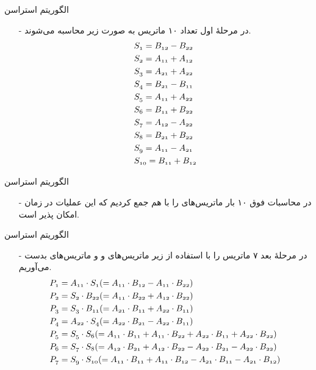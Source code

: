 \begin{frame}{‌الگوریتم استراسن}
\begin{itemize}\itemr
\item[-]
در مرحلهٔ اول تعداد ۱۰ ماتریس 
 به صورت زیر محاسبه می‌شوند.
\begin{align*}
&\mathnormal{S_1 = B_{12} - B_{22}}\\
&\mathnormal{S_2 = A_{11} + A_{12}}\\
&\mathnormal{S_3 = A_{21} + A_{22}}\\
&\mathnormal{S_4 = B_{21} - B_{11}}\\
&\mathnormal{S_5 = A_{11} + A_{22}}\\
&\mathnormal{S_6 = B_{11} + B_{22}}\\
&\mathnormal{S_7 = A_{12} - A_{22}}\\
&\mathnormal{S_8 = B_{21} + B_{22}}\\
&\mathnormal{S_9 = A_{11} - A_{21}}\\
&\mathnormal{S_{10} = B_{11} + B_{12}}\\
\end{align*}
\end{itemize}
\end{frame}


\begin{frame}{‌الگوریتم استراسن}
\begin{itemize}\itemr
\item[-]
در محاسبات فوق ۱۰ بار ماتریس‌های
را با هم جمع کردیم که این عملیات در زمان
امکان پذیر است.
\end{itemize}
\end{frame}


\begin{frame}{‌الگوریتم استراسن}
\begin{itemize}\itemr
\item[-]
در مرحلهٔ بعد ۷ ماتریس 
 را با استفاده از زیر ماتریس‌های 
  و 
   و ماتریس‌های 
    بدست می‌آوریم.
\begin{align*}
&\mathnormal{P_1 = A_{11} \cdot S_1 (= A_{11} \cdot B_{12} - A_{11} \cdot B_{22})}\\
&\mathnormal{P_2 = S_2 \cdot B_{22} (= A_{11} \cdot B_{22} + A_{12} \cdot B_{22})} \\
&\mathnormal{P_3 = S_3 \cdot B_{11} (= A_{21} \cdot B_{11} + A_{22} \cdot B_{11})}\\
&\mathnormal{P_4 = A_{22} \cdot S_4 (= A_{22} \cdot B_{21} - A_{22} \cdot B_{11})}\\
&\mathnormal{P_5 = S_5 \cdot S_6 (= A_{11} \cdot B_{11} + A_{11} \cdot B_{22} + A_{22} \cdot B_{11} + A_{22} \cdot B_{22})}\\
&\mathnormal{P_6 = S_7 \cdot S_8 (= A_{12} \cdot B_{21} + A_{12} \cdot B_{22} - A_{22} \cdot B_{21} - A_{22} \cdot B_{22})}\\
&\mathnormal{P_7 = S_9 \cdot S_{10} (= A_{11} \cdot B_{11} + A_{11} \cdot B_{12} - A_{21} \cdot B_{11} - A_{21} \cdot B_{12})}
\end{align*}
\end{itemize}
\end{frame}


